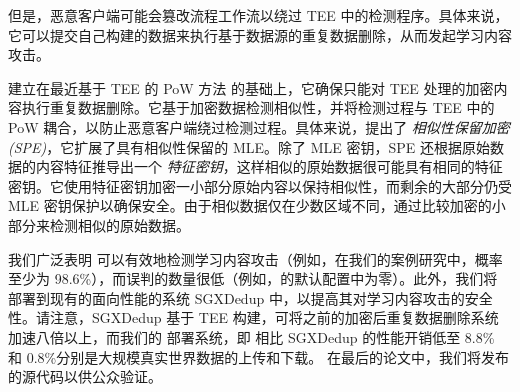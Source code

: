 但是，恶意客户端可能会篡改流程工作流以绕过 TEE 中的检测程序。具体来说，它可以提交自己构建的数据来执行基于数据源的重复数据删除，从而发起学习内容攻击。

\sysnameF 建立在最近基于 TEE 的 PoW 方法 \cite{ren21} 的基础上，它确保只能对 TEE 处理的加密内容执行重复数据删除。它基于加密数据检测相似性，并将检测过程与 TEE 中的 PoW 耦合，以防止恶意客户端绕过检测过程。具体来说，\sysnameF 提出了 {\em 相似性保留加密 (SPE)}，它扩展了具有相似性保留的 MLE。除了 MLE 密钥，SPE 还根据原始数据的内容特征推导出一个 {\em 特征密钥}，这样相似的原始数据很可能具有相同的特征密钥。它使用特征密钥加密一小部分原始内容以保持相似性，而剩余的大部分仍受 MLE 密钥保护以确保安全。由于相似数据仅在少数区域不同，\sysnameF 通过比较加密的小部分来检测相似的原始数据。


我们广泛表明 \sysnameF 可以有效地检测学习内容攻击（例如，在我们的案例研究中，概率至少为 98.6\%），而误判的数量很低（例如，\sysnameF 的默认配置中为零）。此外，我们将 \sysnameF 部署到现有的面向性能的系统 SGXDedup \cite{ren21} 中，以提高其对学习内容攻击的安全性。请注意，SGXDedup 基于 TEE 构建，可将之前的加密后重复数据删除系统 \cite{bellare13b} 加速八倍以上，而我们的 \sysnameF 部署系统，即 \prototype 相比 SGXDedup 的性能开销低至 8.8\% 和 0.8\%分别是大规模真实世界数据的上传和下载。
在最后的论文中，我们将发布 \prototype 的源代码以供公众验证。
